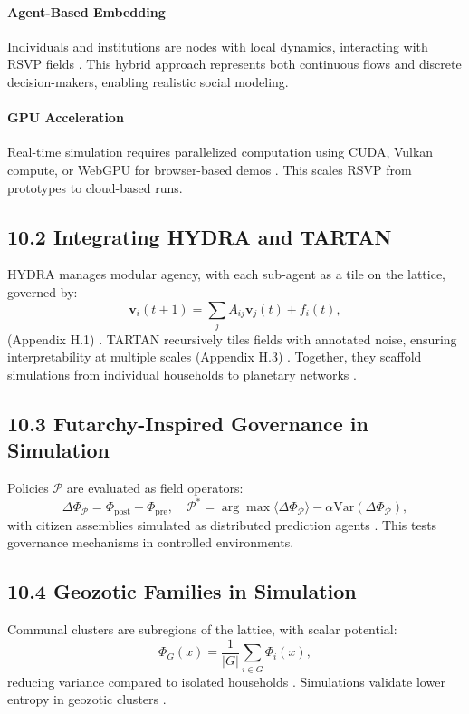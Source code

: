 \documentclass[12pt]{article}
\begin{document}
\paragraph{Agent-Based Embedding}
Individuals and institutions are nodes with local dynamics, interacting with RSVP fields \citep{pearl2009}. This hybrid approach represents both continuous flows and discrete decision-makers, enabling realistic social modeling.
\paragraph{GPU Acceleration}
Real-time simulation requires parallelized computation using CUDA, Vulkan compute, or WebGPU for browser-based demos \citep{bird1988}. This scales RSVP from prototypes to cloud-based runs.
\subsection*{10.2 Integrating HYDRA and TARTAN}
HYDRA manages modular agency, with each sub-agent as a tile on the lattice, governed by:
\[
\mathbf{v}_i(t+1) = \sum_j A_{ij} \mathbf{v}_j(t) + f_i(t),
\]
(Appendix H.1) \citep{bird1988}. TARTAN recursively tiles fields with annotated noise, ensuring interpretability at multiple scales (Appendix H.3) \citep{milewski2018}. Together, they scaffold simulations from individual households to planetary networks \citep{friston2010}.
\subsection*{10.3 Futarchy-Inspired Governance in Simulation}
Policies \(\mathcal{P}\) are evaluated as field operators:
\[
\Delta \Phi_{\mathcal{P}} = \Phi_{\text{post}} - \Phi_{\text{pre}}, \quad \mathcal{P}^* = \arg \max \langle \Delta \Phi_{\mathcal{P}} \rangle - \alpha \mathrm{Var}(\Delta \Phi_{\mathcal{P}}),
\]
with citizen assemblies simulated as distributed prediction agents \citep{hanson2003}. This tests governance mechanisms in controlled environments.
\subsection*{10.4 Geozotic Families in Simulation}
Communal clusters are subregions of the lattice, with scalar potential:
\[
\Phi_G(x) = \frac{1}{|G|} \sum_{i \in G} \Phi_i(x),
\]
reducing variance compared to isolated households \citep{cover2006}. Simulations validate lower entropy in geozotic clusters \citep{deleuze1987}.
\end{document}

